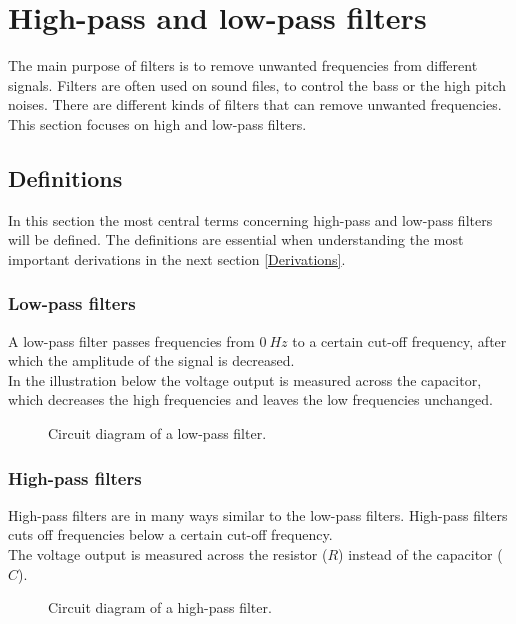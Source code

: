 \chapter{High-pass and low-pass filters}
The main purpose of filters is to remove unwanted frequencies from different signals. Filters are often used on sound files, to control the bass or the high pitch noises. There are different kinds of filters that can remove unwanted frequencies. This section focuses on high and low-pass filters.
\section{Definitions}
In this section the most central terms concerning high-pass and low-pass filters will be defined. The definitions are essential when understanding the most important derivations in the next section \ref{Derivations}.
\subsection{Low-pass filters}
A low-pass filter passes frequencies from  $0~Hz$ to a certain cut-off frequency, after which the amplitude of the signal is decreased.  
\\
In the illustration below the voltage output is measured across the capacitor, which decreases the high frequencies and leaves the low frequencies unchanged.
\\
\begin{figure}[H]
	
	\caption{Circuit diagram of a low-pass filter.} \label{lp:diagram}
\end{figure} 
\subsection{High-pass filters}
High-pass filters are in many ways similar to the low-pass filters. High-pass filters cuts off frequencies below a certain cut-off frequency. \\
The voltage output is measured across the resistor ($R$) instead of the capacitor ($C$). 
\begin{figure}[H]
	
	\caption{Circuit diagram of a high-pass filter.}
	\label{hp:diagram}
\end{figure} 

